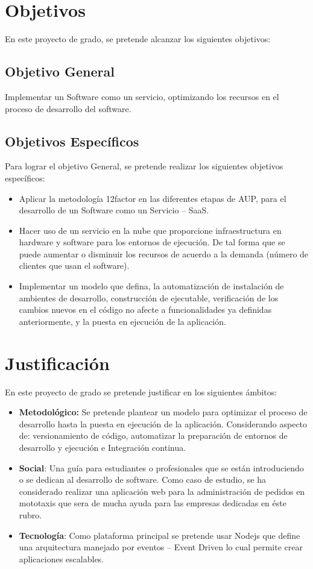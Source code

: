\section{Objetivos}
\noindent En este proyecto de grado, se pretende alcanzar los siguientes objetivos:

\subsection{Objetivo General}

\noindent Implementar un Software como un servicio, optimizando los recursos en el proceso de desarrollo del software. 


\subsection{Objetivos Específicos}

\noindent Para lograr el objetivo General, se pretende realizar los siguientes objetivos específicos:
\begin{itemize}
  \item Aplicar la metodología 12factor en las diferentes etapas de AUP, para el desarrollo de un Software como un Servicio – SaaS.
  \item Hacer uso de un servicio en la nube que proporcione  infraestructura en hardware y software para los entornos de ejecución. De tal forma que se puede aumentar o disminuir los recursos de acuerdo a la demanda (número de clientes que usan el software).
  \item Implementar un modelo que defina, la automatización de instalación de ambientes de desarrollo, construcción de ejecutable, verificación de los cambios nuevos en el código no afecte a funcionalidades ya definidas anteriormente, y la puesta en ejecución de la aplicación.
\end{itemize}

\section{Justificación}
\noindent En este proyecto de grado se pretende justificar en los siguientes ámbitos:
\begin{itemize}
  \item \textbf{Metodológico:} Se pretende plantear un modelo para optimizar el proceso de desarrollo hasta la puesta en ejecución de la aplicación. Considerando aspecto de: versionamiento de código, automatizar la preparación de entornos de desarrollo y ejecución e Integración continua.
  \item \textbf{Social}: Una guía para estudiantes o profesionales que se están introduciendo o se dedican al desarrollo de software. Como caso de estudio, se ha considerado realizar una aplicación web para la administración de pedidos en mototaxis que sera de mucha ayuda para las empresas dedicadas en  éste rubro.
  \item \textbf{Tecnología}: Como plataforma principal se pretende usar Nodejs que define una arquitectura manejado por eventos – Event Driven lo cual permite crear aplicaciones escalables.
\end{itemize}

